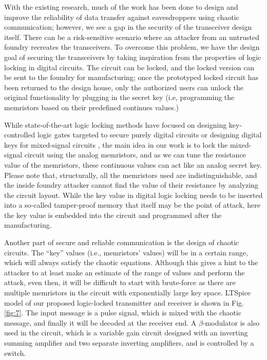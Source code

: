 With the existing research, much of the work has been done to design and improve the reliability of data transfer against eavesdroppers using chaotic communication; however, we see a gap in the security of the transceiver design itself. There can be a risk-sensitive scenario where an attacker from an untrusted foundry recreates the transceivers. To overcome this problem, we have the design goal of securing the transceivers by taking inspiration from the properties of logic locking in digital circuits. The circuit can be locked, and the locked version can be sent to the foundry for manufacturing; once the prototyped locked circuit has been returned to the design house, only the authorized users can unlock the original functionality by plugging in the secret key {\color{red}(i.e, programming the memristors based on their predefined continues values.)}

While state-of-the-art logic locking methods \cite{Koushanfar-LL,limaye2021fortifying,9427060} have focused on designing key-controlled logic gates targeted to secure purely digital circuits or designing digital keys for mixed-signal circuits \cite{8715043}, the main idea in our work is to lock the mixed-signal circuit using the analog memristors, and as we can tune the resistance value of the memristors, these continuous values can act like an analog secret key. Please note that, structurally, all the memristors used are indistinguishable, and the inside foundry attacker cannot find the value of their resistance by analyzing the circuit layout. While the key value in digital logic locking needs to be inserted into a so-called tamper-proof memory that itself may be the point of attack, here the key value is embedded into the circuit and programmed after the manufacturing.

Another part of secure and reliable communication is the design of chaotic circuits. The ``key'' values (i.e., memristors' values) will be in a certain range, which will always satisfy the chaotic equations. Although this gives a hint to the attacker to at least make an estimate of the range of values and perform the attack, even then, it will be difficult to start with brute-force as there are multiple memristors in the circuit with exponentially large key space. LTSpice model of our proposed logic-locked transmitter and receiver is shown in Fig. \ref{fig:7}. The input message is a pulse signal, which is mixed with the chaotic message, and finally it will be decoded at the receiver end. A \(\beta\)-modulator is also used in the circuit, which is a variable gain circuit designed with an inverting summing amplifier and two separate inverting amplifiers, and is controlled by a switch.

